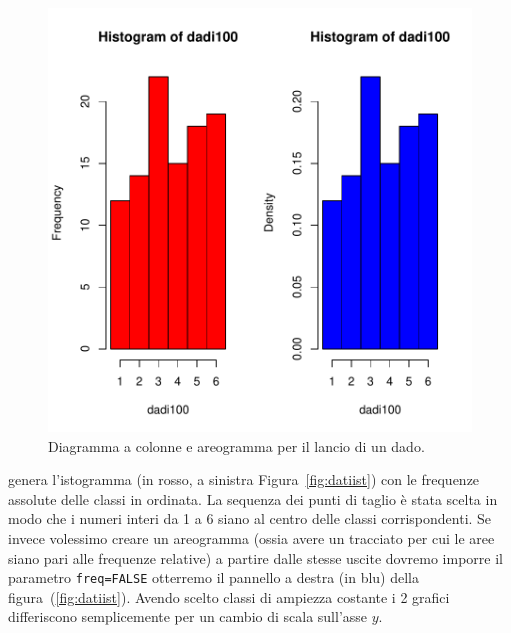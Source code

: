 \documentclass[onecolumn,11pt]{book}
\begin{document}
\begin{figure}[htbp]
\begin{center}
\includegraphics{statisticaconR-162}
\caption{ Diagramma a colonne e areogramma per il lancio di un dado.}
\label{fig:datiiist}
\end{center}
\end{figure}
genera l'istogramma (in rosso, a sinistra Figura~\ref{fig:datiist}) con le frequenze assolute delle classi in ordinata. La sequenza dei punti di taglio \`e stata scelta in modo che i numeri interi da 1 a 6 siano al centro delle classi corrispondenti. Se invece volessimo creare un areogramma  (ossia avere un tracciato per cui le aree siano pari alle frequenze relative) a partire dalle stesse uscite dovremo imporre il parametro \texttt{freq=FALSE} otterremo il pannello a destra (in blu) della figura~(\ref{fig:datiist}). Avendo scelto classi di ampiezza costante i 2 grafici differiscono semplicemente per un cambio di scala sull'asse $y$.
 
\end{document}
